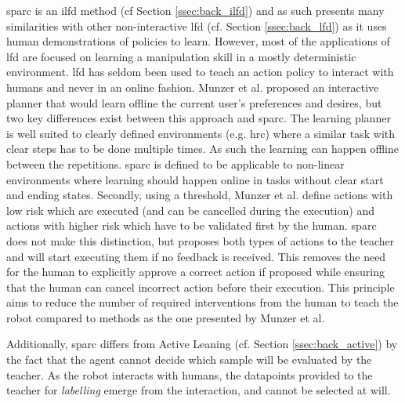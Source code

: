\gls{sparc} is an \acrfull{ilfd} method (cf Section \ref{ssec:back_ilfd}) and as such presents many similarities with other non-interactive \gls{lfd} (cf. Section \ref{ssec:back_lfd}) as it uses human demonstrations of policies to learn. However, most of the applications of \gls{lfd} \citep{argall2009survey,billard2008robot} are focused on learning a manipulation skill in a mostly deterministic environment. \gls{lfd} has seldom been used to teach an action policy to interact with humans \citep{liu2014train,sequeira2016discovering,munzer2017efficient} and never in an online fashion. Munzer et al. proposed an interactive planner that would learn offline the current user's preferences and desires, but two key differences exist between this approach and \gls{sparc}. The learning planner is well suited to clearly defined environments (e.g. \gls{hrc}) where a similar task with clear steps has to be done multiple times. As such the learning can happen offline between the repetitions. \gls{sparc} is defined to be applicable to non-linear environments where learning should happen online in tasks without clear start and ending states. Secondly, using a threshold, Munzer et al. define actions with low risk which are executed (and can be cancelled during the execution) and actions with higher risk which have to be validated first by the human. \gls{sparc} does not make this distinction, but proposes both types of actions to the teacher and will start executing them if no feedback is received. This removes the  need for the human to explicitly approve a correct action if proposed while ensuring that the human can cancel incorrect action before their execution. This principle aims to reduce the number of required interventions from the human to teach the robot compared to methods as the one presented by Munzer et al. 

Additionally, \gls{sparc} differs from Active Leaning (cf. Section \ref{ssec:back_active}) by the fact that the agent cannot decide which sample will be evaluated by the teacher. As the robot interacts with humans, the datapoints provided to the teacher for \textit{labelling} emerge from the interaction, and cannot be selected at will. 
    


